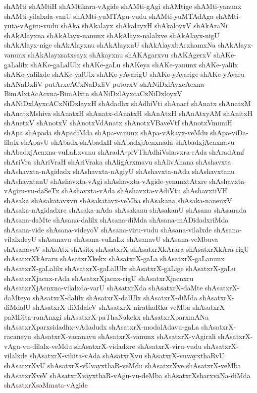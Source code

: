 {shAMti
shAMtiH
shAMtikara-vAgide
shAMti-gAgi
shAMtige
shAMti-yanunx
shAMti-yilalxda-vanU
shAMti-yuMTAgu-vudu
shAMti-yuMTAdAga
shAMti-yuta-vAgiru-vudu
shAka
shAkalayx
shAkalayxH
shAkaloyxV
shAkAraNi
shAkAlayxna
shAkAlayx-nanunx
shAkAlayx-nalalxve
shAkAlayx-nigU
shAkAlayx-nige
shAkAlayxnu
shAkAlayxnU
shAkAlayxbArxhamxNa
shAkAlayx-vanunx
shAkAlayxsatxsayx
shAkayxnu
shAKAgarxvu
shAKAgerxV
shAKe-gaLalilx
shAKe-gaLalUlx
shAKe-gaLu
shAKeya
shAKe-yanunx
shAKe-yalilx
shAKe-yalilxde
shAKe-yalUlx
shAKe-yAvarigU
shAKe-yAvarige
shAKe-yAvaru
shANaDxliV-putArxcACxNaDxliV-putorxV
shANiDxlAyxcAcxna-BimAlxtAcAcxna-BimAlxta
shANiDxlAyxcaCxNiDxloyxV
shANiDxlAyxcACxNiDxlayxH
shAdadhx
shAdhiVti
shAnacf
shAnatx
shAnatxM
shAnatxMshiva
shAnatxH
shAnatx-dAnatxH
shAnAtxH
shAnAtxyAM
shAnitxH
shAnetxV
shAnotxV
shAnotxVdAnatx
shAnotxVBaveVtf
shAnotxVmuniH
shApa
shApada
shApadiMda
shApa-vanunx
shApa-vAkayx-veMdu
shApa-viDa-lilalx
shApavU
shAbadx
shAbadxH
shAbadxjAcnxnada
shAbadxjAcnxnavu
shAbadxjAcnxna-vuLaLxvanu
shAradA-piVThAdhiVshavxra-rAda
shAradAmf
shAriVra
shAriVraH
shAriVraka
shAligArxmavu
shAlivAhana
shAshavxta
shAshavxta-nAgidadx
shAshavxta-nAgiyU
shAshavxta-nAda
shAshavxtanu
shAshavxtanU
shAshavxta-vAgi
shAshavxta-vAgide-yenunxtAtxre
shAshavxta-vAgiru-vu-daSeTx
shAshavxta-vAda
shAshavxta-vAdiVtu
shAshavxtiVH
shAsaka
shAsakatavxvu
shAsakatavx-veMba
shAsakana
shAsaka-nanenxV
shAsaka-nAgidadxre
shAsaka-nAda
shAsakanu
shAsakanU
shAsana
shAsanada
shAsana-daMte
shAsana-dalilx
shAsana-diMda
shAsana-mADidadxriMda
shAsana-vide
shAsana-videyoV
shAsana-viru-vudu
shAsana-vilalxde
shAsana-vilalxdeyU
shAsanavu
shAsana-vuLaLx
shAsanavU
shAsana-veMbuva
shAsanaveV
shAsAtx
shAsitx
shAsatxrX
shAsatxrXkArara
shAsatxrXkAra-rigU
shAsatxrXkAraru
shAsatxrXkekx
shAsatxrX-gaLa
shAsatxrX-gaLanunx
shAsatxrX-gaLalilx
shAsatxrX-gaLalUlx
shAsatxrX-gaLige
shAsatxrX-gaLu
shAsatxrXjacnx-rAda
shAsatxrXjacnx-rigU
shAsatxrXjacnxru
shAsatxrXjAcnxna-vilalxda-varU
shAsatxrXda
shAsatxrX-daMte
shAsatxrX-daMteyo
shAsatxrX-dalilx
shAsatxrX-dalUlx
shAsatxrX-diMda
shAsatxrX-diMdalU
shAsatxrX-diMdaleV
shAsatxrX-nirathaRka-veMba
shAsatxrX-paMDita-ranAnxgi
shAsatxrX-paThaNakekx
shAsatxrXparxmANa
shAsatxrXparxsidadhx-vAdadudx
shAsatxrX-modalAdavu-gaLa
shAsatxrX-racaneyu
shAsatxrX-vacanavu
shAsatxrX-vanunx
shAsatxrX-vAgirali
shAsatxrX-vAgu-vu-dilalx-veMdu
shAsatxrX-vidadxre
shAsatxrX-viru-vudu
shAsatxrX-vilalxde
shAsatxrX-vihita-vAda
shAsatxrXvu
shAsatxrX-vuvayxthaRvU
shAsatxrXvU
shAsatxrX-vUvayxthaR-veMdu
shAsatxrXve
shAsatxrX-veMba
shAsatxrXveV
shAsatxrXvayxthaR-vAgu-vu-deMba
shAsatxrXsharxvaNa-diMda
shAsatxrXsaMmata-vAgide
}
